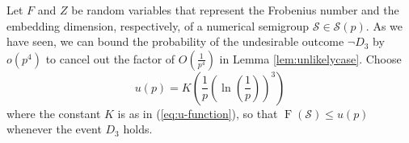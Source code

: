 \documentclass[11pt]{amsart}
\newtheorem{lemma}[theorem]{Lemma}
\theoremstyle{definition}
\theoremstyle{remark}
\def\Pr{\ensuremath{\mathrm{Pr}}}
\def\nsg{\ensuremath{\mathcal{S}}}
\DeclareMathOperator\F{F}
\begin{document}
Let $F$ and $Z$ be random variables that represent the Frobenius number and the embedding dimension, respectively, of a numerical semigroup $\nsg \in \nsg(p)$. As we have seen,
we can bound the probability of the undesirable outcome $\lnot D_3$ by $o\left(p^4\right)$ to cancel out the factor of $O \left( \frac{1}{p^4}\right)$ in Lemma \ref{lem:unlikelycase}. Choose \[u(p) = K \left(\frac{1}{p} \left( \ln \left(\frac{1}{p}\right)\right)^3  \right)\]
  where the constant $K$ is as in (\ref{eq:u-function}), so that $\F(\nsg) \leq u(p)$ whenever the event $D_3$ holds. 


\end{document}
